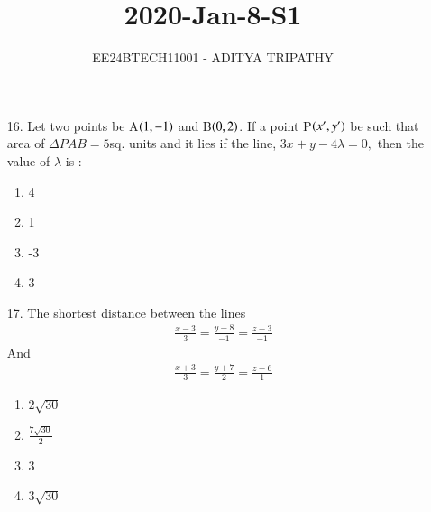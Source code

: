 \documentclass[journal,12pt,onecolumn]{IEEEtran}
\theoremstyle{remark}
\begin{document}

\vspace{3cm}

\title{2020-Jan-8-S1}
\author{EE24BTECH11001 -  ADITYA TRIPATHY}
\maketitle

\renewcommand{\thefigure}{\theenumi}
\renewcommand{\thetable}{\theenumi}

\begin{enumerate}
	\item[16.] 
		Let two points be A$\left(1, -1\right)$ and B$\left(0, 2\right)$. If a point P$\left(x', y'\right)$ be
		such that area of $\Delta PAB = 5$sq. units and it lies if the line, $3x + y - 4\lambda = 0,$ then
		the value of $\lambda$ is :
		\hfill{}
	\begin{multicols}{4}
		\begin{enumerate}
			\item 4 
			\columnbreak
			\item 1
			\columnbreak
			\item -3
			\columnbreak
			\item 3
		\end{enumerate}
	\end{multicols}

	\item[17.] The shortest distance between the lines
		\begin{align*}
		\frac{x-3}{3} = \frac{y-8}{-1} = \frac{z-3}{-1}
		\end{align*} And
		\begin{align}
			\frac{x+3}{3} = \frac{y+7}{2} = \frac{z-6}{1}
		\end{align}
		\hfill{}
	\begin{multicols}{4}
		\begin{enumerate}
			\item $2\sqrt{30}$ \columnbreak
			\item $\frac{7\sqrt{30}}{2}$ \columnbreak
			\item 3 \columnbreak
			\item $3\sqrt{30}$
		\end{enumerate}
	\end{multicols}



\end{enumerate}
\end{document}

